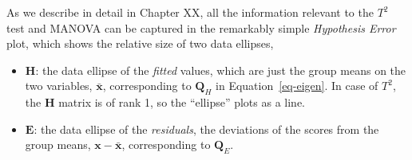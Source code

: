 \documentclass[
  letterpaper,
  10pt,
  krantz2]{krantz}
\makeatletter
\newenvironment{Shaded}{\begin{snugshade}}{\end{snugshade}}
\newcommand{\CommentTok}[1]{\textcolor[rgb]{0.37,0.37,0.37}{#1}}
\newcommand{\DecValTok}[1]{\textcolor[rgb]{0.68,0.00,0.00}{#1}}
\newcommand{\FunctionTok}[1]{\textcolor[rgb]{0.28,0.35,0.67}{#1}}
\newcommand{\NormalTok}[1]{\textcolor[rgb]{0.00,0.23,0.31}{#1}}
\newcommand{\OtherTok}[1]{\textcolor[rgb]{0.00,0.23,0.31}{#1}}
\newcommand{\SpecialCharTok}[1]{\textcolor[rgb]{0.37,0.37,0.37}{#1}}
\providecommand{\tightlist}{%
  \setlength{\itemsep}{0pt}\setlength{\parskip}{0pt}}\usepackage{longtable,booktabs,array}
\newenvironment{kframe}{%
  \medskip{}
  \setlength{\fboxsep}{.8em}
  \def\at@end@of@kframe{}%
  \ifinner\ifhmode%
  \def\at@end@of@kframe{\end{minipage}}%
  \begin{minipage}{\columnwidth}%
  \fi\fi%
  \def\FrameCommand##1{\hskip\@totalleftmargin \hskip-\fboxsep
  \colorbox{shadecolor}{##1}\hskip-\fboxsep
      \hskip-\linewidth \hskip-\@totalleftmargin \hskip\columnwidth}%
  \MakeFramed {\advance\hsize-\width
    \@totalleftmargin\z@ \linewidth\hsize
    \@setminipage}}%
{\par\unskip\endMakeFramed%
  \at@end@of@kframe}
\renewenvironment{Shaded}{\begin{kframe}}{\end{kframe}}
\makeatother
\begin{document}
As we describe in detail in Chapter XX, all the information relevant to
the \(T^2\) test and MANOVA can be captured in the remarkably simple
\emph{Hypothesis Error} plot, which shows the relative size of two data
ellipses,

\begin{itemize}
\tightlist
\item
  \(\mathbf{H}\): the data ellipse of the \emph{fitted} values, which
  are just the group means on the two variables, \(\bar{\mathbf{x}}\),
  corresponding to \(\mathbf{Q}_H\) in Equation~\ref{eq-eigen}. In case
  of \(T^2\), the \(\mathbf{H}\) matrix is of rank 1, so the ``ellipse''
  plots as a line.
\end{itemize}

\begin{Shaded}
\end{Shaded}

\begin{itemize}
\tightlist
\item
  \(\mathbf{E}\): the data ellipse of the \emph{residuals}, the
  deviations of the scores from the group means,
  \(\mathbf{x} - \bar{\mathbf{x}}\), corresponding to \(\mathbf{Q}_E\).
\end{itemize}
\end{document}
